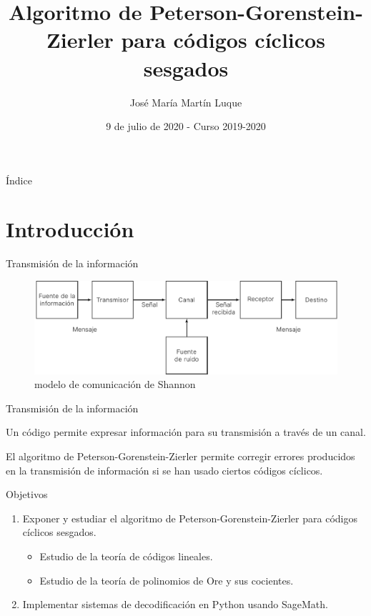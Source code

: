 \documentclass[spanish,aspectratio=169]{beamer}
\title{Algoritmo de Peterson-Gorenstein-Zierler para códigos cíclicos sesgados}
\author{José María Martín Luque}
\institute{Universidad de Granada}
\date{9 de julio de 2020 - Curso 2019-2020}
\begin{document}
\maketitle

\begin{frame}{Índice}
  \tableofcontents
\end{frame}

\section{Introducción}

\begin{frame}{Transmisión de la información}
  \begin{figure}[h]
    \centering
    \includegraphics[width=\textwidth]{assets/shannon-communication-model}
    \caption{modelo de comunicación de Shannon}
  \end{figure}
\end{frame}

\begin{frame}{Transmisión de la información}
  
  Un código permite expresar información para su transmisión a través de un canal.
  
  El algoritmo de Peterson-Gorenstein-Zierler permite corregir errores producidos en la transmisión de información si se han usado ciertos códigos cíclicos.
  
\end{frame}

\begin{frame}{Objetivos}
  
  \begin{enumerate}
    \item Exponer y estudiar el algoritmo de Peterson-Gorenstein-Zierler para códigos cíclicos sesgados.
    \pause
    \begin{itemize}[label={\faArrowCircleRight}]
      \item Estudio de la teoría de códigos lineales.
      \item Estudio de la teoría de polinomios de Ore y sus cocientes.
    \end{itemize}
    \pause
    \item Implementar sistemas de decodificación en Python usando SageMath.
  \end{enumerate}
  
\end{frame}
\end{document}
